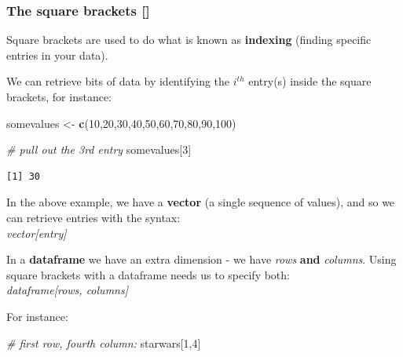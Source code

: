 \documentclass[]{book}
\newenvironment{Shaded}{\begin{snugshade}}{\end{snugshade}}
\newcommand{\CommentTok}[1]{\textcolor[rgb]{0.56,0.35,0.01}{\textit{#1}}}
\newcommand{\DecValTok}[1]{\textcolor[rgb]{0.00,0.00,0.81}{#1}}
\newcommand{\KeywordTok}[1]{\textcolor[rgb]{0.13,0.29,0.53}{\textbf{#1}}}
\newcommand{\NormalTok}[1]{#1}
\newcommand{\StringTok}[1]{\textcolor[rgb]{0.31,0.60,0.02}{#1}}
\begin{document}
\hypertarget{the-square-brackets}{%
\subsubsection*{The square brackets {[}{]}}\label{the-square-brackets}}

Square brackets are used to do what is known as \textbf{indexing} (finding specific entries in your data).

We can retrieve bits of data by identifying the \(i^{th}\) entry(s) inside the square brackets, for instance:

\begin{Shaded}
\begin{Highlighting}[]
\NormalTok{somevalues <-}\StringTok{ }\KeywordTok{c}\NormalTok{(}\DecValTok{10}\NormalTok{,}\DecValTok{20}\NormalTok{,}\DecValTok{30}\NormalTok{,}\DecValTok{40}\NormalTok{,}\DecValTok{50}\NormalTok{,}\DecValTok{60}\NormalTok{,}\DecValTok{70}\NormalTok{,}\DecValTok{80}\NormalTok{,}\DecValTok{90}\NormalTok{,}\DecValTok{100}\NormalTok{)}

\CommentTok{# pull out the 3rd entry}
\NormalTok{somevalues[}\DecValTok{3}\NormalTok{]}
\end{Highlighting}
\end{Shaded}

\begin{verbatim}
[1] 30
\end{verbatim}

In the above example, we have a \textbf{vector} (a single sequence of values), and so we can retrieve entries with the syntax:\\
\hspace*{0.333em}\hspace*{0.333em} \emph{vector{[}entry{]}}

In a \textbf{dataframe} we have an extra dimension - we have \emph{rows} \textbf{and} \emph{columns}.
Using square brackets with a dataframe needs us to specify both:\\
\hspace*{0.333em}\hspace*{0.333em} \emph{dataframe{[}rows, columns{]}}

For instance:

\begin{Shaded}
\begin{Highlighting}[]
\CommentTok{# first row, fourth column:}
\NormalTok{starwars[}\DecValTok{1}\NormalTok{,}\DecValTok{4}\NormalTok{]}
\end{Highlighting}
\end{Shaded}
\end{document}
